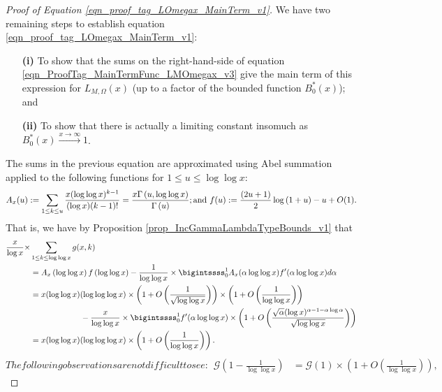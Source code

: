 \documentclass[11pt,reqno,a4letter]{article}
\newcommand{\hlocalref}[1]{\hyperref[#1]{\ref{#1}}}
\numberwithin{equation}{section}
\numberwithin{figure}{section}
\numberwithin{table}{section}
\theoremstyle{plain}
\numberwithin{theorem}{section}
\theoremstyle{definition}
\theoremstyle{remark}
\newcommand{\mathtext}[1]{\text{\rm #1}}
\begin{document}
\begin{proof}[Proof of Equation \eqref{eqn_proof_tag_LOmegax_MainTerm_v1}]
We have two remaining steps to establish equation \eqref{eqn_proof_tag_LOmegax_MainTerm_v1}: 
\begin{itemize}[leftmargin=0.5in]
\item[\textbf{(i)}] To show that the sums on the right-hand-side of equation 
     \eqref{eqn_ProofTag_MainTermFunc_LMOmegax_v3} give the main term of this expression for 
     $L_{M,\Omega}(x)$ (up to a factor of the bounded function $B_0^{\ast}(x)$); and 
\item[\textbf{(ii)}] To show that there is actually a limiting constant insomuch as 
     $B_0^{\ast}(x) \xrightarrow{x \rightarrow \infty} 1$. 
\end{itemize}
The sums in the previous equation are approximated using Abel summation applied to the 
following functions for $1 \leq u \leq \log\log x$: 
\[
A_x(u) := \sum_{1 \leq k \leq u} \frac{x (\log\log x)^{k-1}}{(\log x) (k-1)!} = 
     \frac{x \Gamma\left(u, \log\log x\right)}{\Gamma\left(u\right)}; 
     \mathtext{ and } 
     f(u) := \frac{(2u+1)}{2} \log\left(1 + u\right) - u + O(1). 
\]
That is, we have by Proposition \hlocalref{prop_IncGammaLambdaTypeBounds_v1} that 
\begin{align}
\label{eqn_proof_tag_LOmegax_MainTerm_v2}
\frac{x}{\log x} \times & \sum_{1 \leq k \leq \log\log x} g(x, k) \\ 
\notag
	& = A_x\left(\log\log x\right) f\left(\log\log x\right) - 
	\frac{1}{\log\log x} \times 
	\bigintssss_0^{1} A_x(\alpha \log\log x) f^{\prime}(\alpha \log\log x) d\alpha \\ 
\notag 
     & = 
	x (\log\log x) (\log\log\log x) \times \left(1 + 
	O\left(\frac{1}{\sqrt{\log\log x}}\right)\right) \times \left(1 + 
     O\left(\frac{1}{\log\log x}\right)\right) \\ 
\notag 
     & \phantom{=x(\log\log x)\ } - 
	\frac{x}{\log\log x} \times \bigintssss_0^1 f^{\prime}(\alpha \log\log x) \times 
	\left(1 + O\left(\frac{\sqrt{\alpha} (\log x)^{\alpha-1-\alpha\log\alpha}}{\sqrt{\log\log x}}\right)\right) \\
\notag
	& = 
	x (\log\log x)(\log\log\log x) \times \left(1 + 
	O\left(\frac{1}{\log\log x}\right)\right). 
\end{align}
\begin{subequations}
\label{eqn_ProofTag_MiscObservations_EMMVT_v1}
The following observations are not difficult to see:
\begin{align}
\mathcal{G}\left(1-\frac{1}{\log\log x}\right) & = \mathcal{G}\left(1\right) \times 
	\left(1 + O\left(\frac{1}{\log\log x}\right)\right), 

\end{align}
\end{subequations}
\end{proof}
\end{document}
